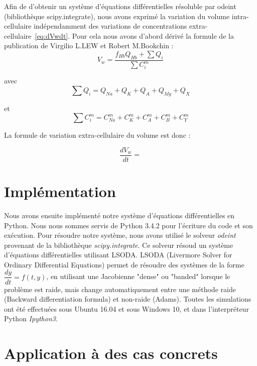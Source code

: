 \documentclass[a4paper,fleqn]{article}
\begin{document}
Afin de  d'obtenir un système d'équations différentielles résoluble par odeint (bibliothèque scipy.integrate), nous avons exprimé la variation du volume intra-cellulaire indépendamment des variations de concentrations extra-cellulaire~\eqref{eq:dVwdt}. Pour cela nous avons d'abord dérivé la formule de la publication de Virgilio L.LEW et Robert M.Bookchin : \\


\begin{equation}
V_{w} = \dfrac{f_{Hb}Q_{Hb}+\sum Q_{i}}{\sum C_{i}^{m}}
\end{equation}

avec
\begin{equation}
\sum Q_{i} = Q_{Na}+Q_{K}+Q_{A}+Q_{Mg}+Q_{X} 
\end{equation}

et 
\begin{equation}
\sum C_{i}^m =C_{Na}^m +C_{K}^m +C_{A}^m +C_{B}^m +C_{Y}^m  
\end{equation}

La formule de variation extra-cellulaire du volume est donc :

\begin{equation}
\frac{dV_w}{dt}=
\end{equation}


\section{Implémentation}   

Nous avons ensuite implémenté notre système d'équations différentielles en Python. Nous nous sommes servis de Python 3.4.2 pour l'écriture du code et son exécution. Pour résoudre notre système, nous avons utilisé le solveur \textit{odeint} provenant de la bibliothèque \textit{scipy.integrate}. Ce solveur résoud un système d'équations différentielles utilisant LSODA. LSODA (Livermore Solver for Ordinary Differential Equations) permet de résoudre des systèmes de la forme $\dfrac{dy}{dt}=f\left(t,y\right)$, en utilisant une Jacobienne "dense" ou "banded" lorsque le problème est raide, mais change automatiquement entre une méthode raide (Backward differentiation formula) et non-raide (Adams).
Toutes les simulations ont été effectuées sous Ubuntu 16.04 et sous Windows 10, et dans l'interpréteur Python \textit{Ipython3}.
   






\section{Application à des cas concrets}     
\end{document}
